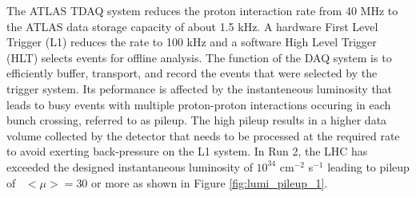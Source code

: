 The ATLAS TDAQ system reduces the 
proton interaction rate from 40 MHz to the ATLAS data storage capacity of about 1.5 kHz. 
A hardware First Level Trigger (L1) reduces the rate to 100 kHz and a software High Level Trigger (HLT) selects events for offline analysis. 
The function of the DAQ system is to efficiently buffer, transport, and record the events that were selected by the trigger system. 
Its peformance is affected by the instanteneous luminosity that leads to busy events with multiple proton-proton interactions occuring in each 
bunch crossing, referred to as pileup. The high pileup results in a higher data volume collected by the detector that needs to be 
processed at the required rate to avoid exerting back-pressure on the L1 system. 
In Run 2, the LHC has exceeded the designed instantaneous luminosity of $10^{34}$ cm$^{-2}$ s$^{-1}$ leading to pileup of~ $<\mu>=30$ or more as shown 
in Figure \ref{fig:lumi_pileup_1}.
